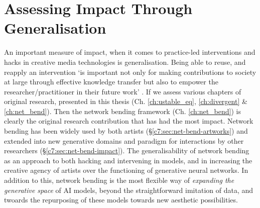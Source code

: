 \section{Assessing Impact Through Generalisation}
\label{c8:sec:generalisation}

An important measure of impact, when it comes to practice-led interventions and hacks in creative media technologies is generalisation.
Being able to reuse, and reapply an intervention `is important not only for making contributions to society at large through effective knowledge transfer but also to empower the researcher/practitioner in their future work' \citep{brown2009integrating}.
If we assess various chapters of original research, presented in this thesis (Ch. \ref{ch:ustable_eq}, \ref{ch:divergent} \& \ref{ch:net_bend}). 
Then the network bending framework (Ch. \ref{ch:net_bend}) is clearly the original research contribution that has had the most impact. 
Network bending has been widely used by both artists (\S \ref{c7:sec:net-bend-artworks}) and extended into new generative domains and paradigm for interactions by other researchers (\S \ref{c7:sec:net-bend-impact}).
The generalisability of network bending as an approach to both hacking and intervening in models, and in increasing the creative agency of artists over the functioning of generative neural networks.
In addition to this, network bending is the most flexible way of \textit{expanding the generative space} of AI models, beyond the straightforward imitation of data, and twoards the repurposing of these models towards new aesthetic possibilities. 
